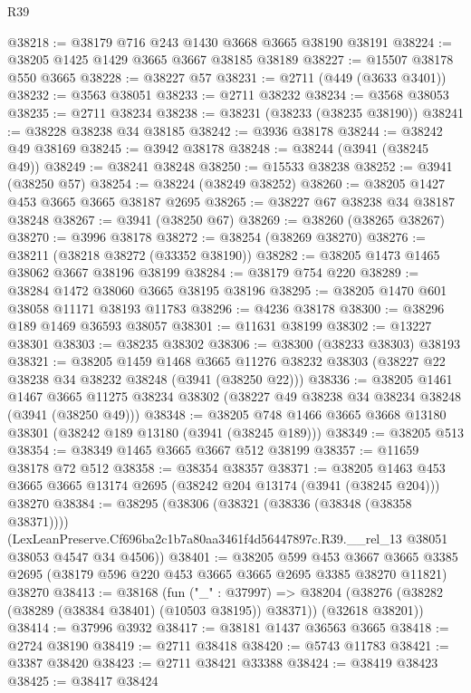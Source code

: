 \begin{lexlean}{R39}
\begin{coremodule}
@38218 := @38179 @716 @243 @1430 @3668 @3665 @38190 @38191
@38224 := @38205 @1425 @1429 @3665 @3667 @38185 @38189
@38227 := @15507 @38178 @550 @3665
@38228 := @38227 @57
@38231 := @2711 (@449 (@3633 @3401))
@38232 := @3563 @38051
@38233 := @2711 @38232
@38234 := @3568 @38053
@38235 := @2711 @38234
@38238 := @38231 (@38233 (@38235 @38190))
@38241 := @38228 @38238 @34 @38185
@38242 := @3936 @38178
@38244 := @38242 @49 @38169
@38245 := @3942 @38178
@38248 := @38244 (@3941 (@38245 @49))
@38249 := @38241 @38248
@38250 := @15533 @38238
@38252 := @3941 (@38250 @57)
@38254 := @38224 (@38249 @38252)
@38260 := @38205 @1427 @453 @3665 @3665 @38187 @2695
@38265 := @38227 @67 @38238 @34 @38187 @38248
@38267 := @3941 (@38250 @67)
@38269 := @38260 (@38265 @38267)
@38270 := @3996 @38178
@38272 := @38254 (@38269 @38270)
@38276 := @38211 (@38218 @38272 (@33352 @38190))
@38282 := @38205 @1473 @1465 @38062 @3667 @38196 @38199
@38284 := @38179 @754 @220
@38289 := @38284 @1472 @38060 @3665 @38195 @38196
@38295 := @38205 @1470 @601 @38058 @11171 @38193 @11783
@38296 := @4236 @38178
@38300 := @38296 @189 @1469 @36593 @38057
@38301 := @11631 @38199
@38302 := @13227 @38301
@38303 := @38235 @38302
@38306 := @38300 (@38233 @38303) @38193
@38321 := @38205
    @1459
    @1468
    @3665
    @11276
    @38232
    @38303
    (@38227 @22 @38238 @34 @38232 @38248 (@3941 (@38250 @22)))
@38336 := @38205
    @1461
    @1467
    @3665
    @11275
    @38234
    @38302
    (@38227 @49 @38238 @34 @38234 @38248 (@3941 (@38250 @49)))
@38348 := @38205 @748 @1466 @3665 @3668 @13180 @38301 (@38242 @189 @13180 (@3941 (@38245 @189)))
@38349 := @38205 @513
@38354 := @38349 @1465 @3665 @3667 @512 @38199
@38357 := @11659 @38178 @72 @512
@38358 := @38354 @38357
@38371 := @38205
    @1463
    @453
    @3665
    @3665
    @13174
    @2695
    (@38242 @204 @13174 (@3941 (@38245 @204)))
    @38270
@38384 := @38295
    (@38306
      (@38321 (@38336 (@38348 (@38358 @38371))))
      (LexLeanPreserve.Cf696ba2c1b7a80aa3461f4d56447897c.R39.__rel_13
        @38051
        @38053
        @4547
        @34
        @4506))
@38401 := @38205
    @599
    @453
    @3667
    @3665
    @3385
    @2695
    (@38179 @596 @220 @453 @3665 @3665 @2695 @3385 @38270 @11821)
    @38270
@38413 := @38168
    (fun ("_" : @37997) =>
    @38204 (@38276 (@38282 (@38289 (@38384 @38401) (@10503 @38195)) @38371)) (@32618 @38201))
@38414 := @37996 @3932
@38417 := @38181 @1437 @36563 @3665
@38418 := @2724 @38190
@38419 := @2711 @38418
@38420 := @5743 @11783
@38421 := @3387 @38420
@38423 := @2711 @38421 @33388
@38424 := @38419 @38423
@38425 := @38417 @38424

\end{coremodule}
\end{lexlean}
